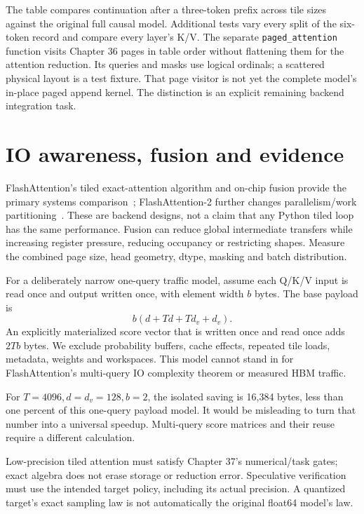 The table compares continuation after a three-token prefix across tile
sizes against the original full causal model. Additional tests vary every
split of the six-token record and compare every layer's K/V. The separate
\texttt{paged\_attention} function visits Chapter 36 pages in table order
without flattening them for the attention reduction. Its queries and masks
use logical ordinals; a scattered physical layout is a test fixture.
That page visitor is not yet the complete model's in-place paged append
kernel. The distinction is an explicit remaining backend integration task.

\section{IO awareness, fusion and evidence}
\label{evod38:io}
FlashAttention's tiled exact-attention algorithm and on-chip fusion provide
the primary systems comparison~\cite{evod38:flash}; FlashAttention-2 further
changes parallelism/work partitioning~\cite{evod38:flash2}. These are backend
designs, not a claim that any Python tiled loop has the same performance.
Fusion can reduce global intermediate transfers while increasing register
pressure, reducing occupancy or restricting shapes. Measure the combined
page size, head geometry, dtype, masking and batch distribution.

For a deliberately narrow one-query traffic model, assume each Q/K/V input
is read once and output written once, with element width $b$ bytes. The
base payload is
\[
 b(d+Td+Td_v+d_v).
\]
An explicitly materialized score vector that is written once and read once
adds $2Tb$ bytes. We exclude probability buffers, cache effects, repeated
tile loads, metadata, weights and workspaces. This model cannot stand in
for FlashAttention's multi-query IO complexity theorem or measured HBM traffic.
\begin{center}\end{center}
For $T=4096,d=d_v=128,b=2$, the isolated saving is 16,384 bytes,
less than one percent of this one-query payload model. It would be
misleading to turn that number into a universal speedup. Multi-query
score matrices and their reuse require a different calculation.

Low-precision tiled attention must satisfy Chapter 37's numerical/task
gates; exact algebra does not erase storage or reduction error. Speculative
verification must use the intended target policy, including its actual
precision. A quantized target's exact sampling law is not automatically
the original float64 model's law.

